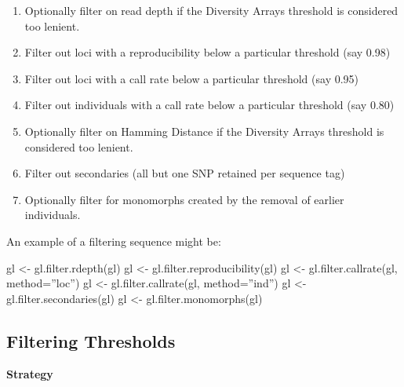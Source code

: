 \documentclass[
  letterpaper,
  DIV=11,
  numbers=noendperiod]{scrreprt}
\newenvironment{Shaded}{\begin{snugshade}}{\end{snugshade}}
\newcommand{\AttributeTok}[1]{\textcolor[rgb]{0.49,0.56,0.16}{#1}}
\newcommand{\FunctionTok}[1]{\textcolor[rgb]{0.02,0.16,0.49}{#1}}
\newcommand{\NormalTok}[1]{\textcolor[rgb]{0.00,0.44,0.13}{#1}}
\newcommand{\OtherTok}[1]{\textcolor[rgb]{0.00,0.44,0.13}{#1}}
\providecommand{\tightlist}{%
  \setlength{\itemsep}{0pt}\setlength{\parskip}{0pt}}\usepackage{longtable,booktabs,array}
\begin{document}
\begin{enumerate}
\def\labelenumi{\arabic{enumi}.}
\tightlist
\item
  Optionally filter on read depth if the Diversity Arrays threshold is
  considered too lenient.
\item
  Filter out loci with a reproducibility below a particular threshold
  (say 0.98)
\item
  Filter out loci with a call rate below a particular threshold (say
  0.95)
\item
  Filter out individuals with a call rate below a particular threshold
  (say 0.80)
\item
  Optionally filter on Hamming Distance if the Diversity Arrays
  threshold is considered too lenient.
\item
  Filter out secondaries (all but one SNP retained per sequence tag)
\item
  Optionally filter for monomorphs created by the removal of earlier
  individuals.
\end{enumerate}

An example of a filtering sequence might be:

\begin{Shaded}
\begin{Highlighting}[]
\NormalTok{gl }\OtherTok{\textless{}{-}} \FunctionTok{gl.filter.rdepth}\NormalTok{(gl)}
\NormalTok{gl }\OtherTok{\textless{}{-}} \FunctionTok{gl.filter.reproducibility}\NormalTok{(gl)}
\NormalTok{gl }\OtherTok{\textless{}{-}} \FunctionTok{gl.filter.callrate}\NormalTok{(gl, }\AttributeTok{method=}\NormalTok{”loc”)}
\NormalTok{gl }\OtherTok{\textless{}{-}} \FunctionTok{gl.filter.callrate}\NormalTok{(gl, }\AttributeTok{method=}\NormalTok{”ind”)}
\NormalTok{gl }\OtherTok{\textless{}{-}} \FunctionTok{gl.filter.secondaries}\NormalTok{(gl)}
\NormalTok{gl }\OtherTok{\textless{}{-}} \FunctionTok{gl.filter.monomorphs}\NormalTok{(gl)}
\end{Highlighting}
\end{Shaded}

\hypertarget{filtering-thresholds}{%
\subsection*{Filtering Thresholds}\label{filtering-thresholds}}

\textbf{Strategy}
\end{document}
